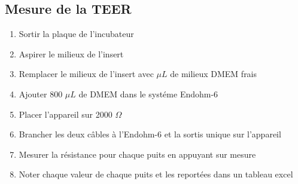 \subsection{Mesure de la TEER}
\label{TEER}

\begin{enumerate}
\item Sortir la plaque de l'incubateur
\item Aspirer le milieux de l'insert
\item Remplacer le milieux de l'insert avec  $\mu L$ de milieux DMEM frais
\item Ajouter 800 $\mu L$ de DMEM dans le systéme Endohm-6
\item Placer l'appareil sur 2000 $\Omega$
\item Brancher les deux câbles à l'Endohm-6 et la sortis unique sur l'appareil
\item Mesurer la résistance pour chaque puits en appuyant sur mesure
\item Noter chaque valeur de chaque puits et les reportées dans un tableau excel
\end{enumerate}